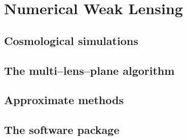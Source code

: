 
\chapter{Numerical Weak Lensing}
\lhead[\fancyplain{}{\thepage}]{\fancyplain{}{\rightmark}}
 \thispagestyle{plain}
\setlength{\parindent}{10mm}


\section{Cosmological simulations}

\section{The multi--lens--plane algorithm}

\section{Approximate methods}

\section{The \LT software package}

%